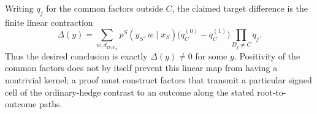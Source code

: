 Writing \(q_j\) for the common factors outside \(C\), the claimed target difference is the finite linear contraction
\[
 \Delta(y)=\sum_{w,d_{D\setminus Y_N}}
 p^S(y_S,w\mid x_S)
 \bigl(q_C^{(0)}-q_C^{(1)}\bigr)
 \prod_{D_j\ne C}q_j.
\]
Thus the desired conclusion is exactly \(\Delta(y)\ne0\) for some \(y\).  Positivity of the common factors does not by itself prevent this linear map from having a nontrivial kernel; a proof must construct factors that transmit a particular signed cell of the ordinary-hedge contrast to an outcome along the stated root-to-outcome paths.
